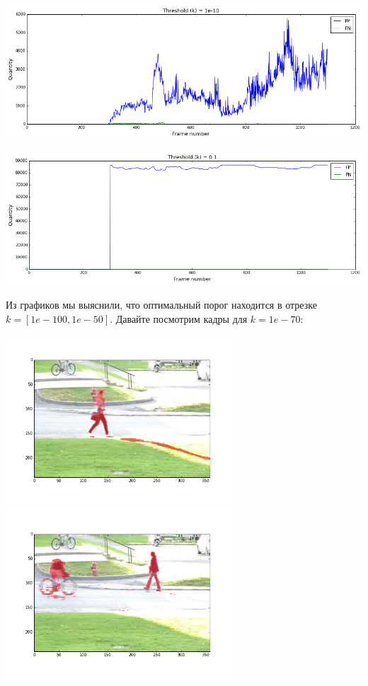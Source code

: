 \documentclass[12pt, a4paper]{article}
\begin{document}
			\begin{center}
				\includegraphics[width=17cm]{3_par_rgb_k_1e_10.png}
			\end{center}
			\begin{center}
				\includegraphics[width=17cm]{3_par_rgb_k_1e_1.png}
			\end{center}
			\newpage
			Из графиков мы выяснили, что оптимальный порог находится в отрезке \\ $k = [1e-100, 1e-50]$. Давайте посмотрим кадры для $k = 1e-70$:

			\begin{center}
				\includegraphics[width=8.5cm]{3_par_rgb_vid_0.png}
				\includegraphics[width=8.5cm]{3_par_rgb_vid_1.png}
			\end{center}
\end{document}
